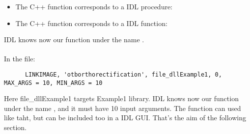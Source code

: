 \begin{itemize}
\item The C++ function corresponds to a IDL procedure:\\
\item The C++ function corresponds to a IDL function:\\
\end{itemize}
IDL knows now our function under the name .\\

\\
      In the  file:\\
\begin{verbatim}
      LINKIMAGE, 'otborthorectification', file_dllExample1, 0, MAX_ARGS = 10, MIN_ARGS = 10
\end{verbatim}

Here file\_dllExample1 targets Example1 library.
IDL knows now our function under the name , and it must have 10 input arguments. The function can used like taht, but can be included too in a IDL GUI.
That's the aim of the following section.\\



